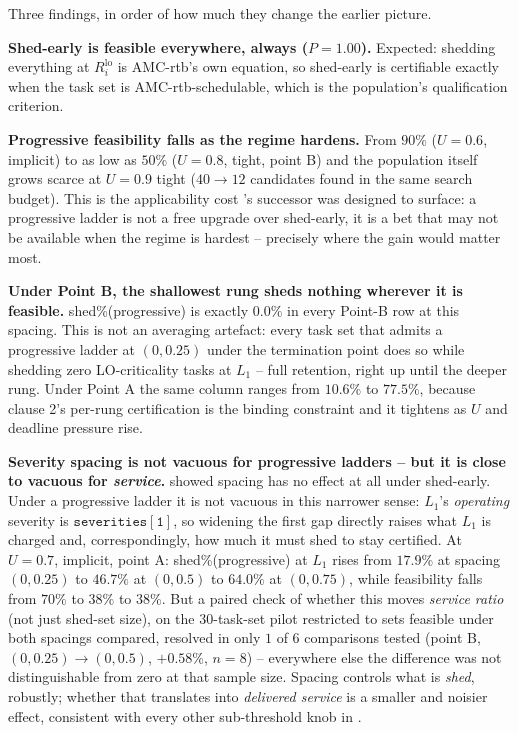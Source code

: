 Three findings, in order of how much they change the earlier picture.

\textbf{Shed-early is feasible everywhere, always ($P = 1.00$).} Expected:
shedding everything at $R_i^{\mathrm{lo}}$ is AMC-rtb's own equation, so shed-early
is certifiable exactly when the task set is AMC-rtb-schedulable, which is the
population's qualification criterion.

\textbf{Progressive feasibility falls as the regime hardens.} From $90\%$
($U=0.6$, implicit) to as low as $50\%$ ($U=0.8$, tight, point B) and the
population itself grows scarce at $U=0.9$ tight ($40 \to 12$ candidates found
in the same search budget). This is the applicability cost 's
successor was designed to surface: a progressive ladder is not a free upgrade
over shed-early, it is a bet that may not be available when the regime is
hardest -- precisely where the gain would matter most.

\textbf{Under Point B, the shallowest rung sheds nothing wherever it is
feasible.} shed\%(progressive) is exactly $0.0\%$ in every Point-B row at this
spacing. This is not an averaging artefact: every task set that admits a
progressive ladder at $(0, 0.25)$ under the termination point does so while
shedding zero LO-criticality tasks at $L_1$ -- full retention, right up until
the deeper rung. Under Point A the same column ranges from $10.6\%$ to
$77.5\%$, because clause 2's per-rung certification is the binding constraint
and it tightens as $U$ and deadline pressure rise.

\textbf{Severity spacing is not vacuous for progressive ladders -- but it is
close to vacuous for \emph{service}.}  showed
spacing has no effect at all under shed-early. Under a progressive ladder it is
not vacuous in this narrower sense: $L_1$'s \emph{operating} severity is
$\mathtt{severities[1]}$, so widening the first gap directly raises what $L_1$
is charged and, correspondingly, how much it must shed to stay certified. At
$U=0.7$, implicit, point A: shed\%(progressive) at $L_1$ rises from
$17.9\%$ at spacing $(0,0.25)$ to $46.7\%$ at $(0,0.5)$ to $64.0\%$ at
$(0,0.75)$, while feasibility falls from $70\%$ to $38\%$ to $38\%$. But a
paired check of whether this moves \emph{service ratio} (not just shed-set
size), on the $30$-task-set pilot restricted to sets feasible under both
spacings compared, resolved in only $1$ of $6$ comparisons tested (point B,
$(0,0.25) \to (0,0.5)$, $+0.58\%$, $n=8$) -- everywhere else the difference
was not distinguishable from zero at that sample size. Spacing controls what
is \emph{shed}, robustly; whether that translates into \emph{delivered
service} is a smaller and noisier effect, consistent with every other
sub-threshold knob in .

